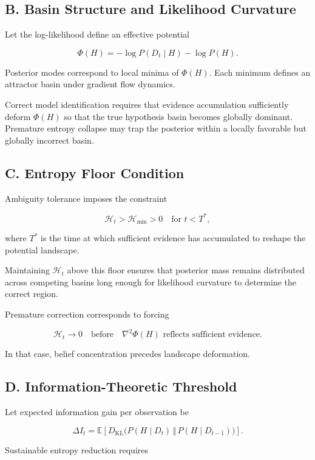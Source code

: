 \documentclass[11pt]{article}
\theoremstyle{remark}
\begin{document}
\subsection*{B. Basin Structure and Likelihood Curvature}

Let the log-likelihood define an effective potential

\[
\Phi(H)
=
- \log P(D_t \mid H) - \log P(H).
\]

Posterior modes correspond to local minima of $\Phi(H)$. Each minimum defines an attractor basin under gradient flow dynamics.

Correct model identification requires that evidence accumulation sufficiently deform $\Phi(H)$ so that the true hypothesis basin becomes globally dominant. Premature entropy collapse may trap the posterior within a locally favorable but globally incorrect basin.

\subsection*{C. Entropy Floor Condition}

Ambiguity tolerance imposes the constraint

\[
\mathcal{H}_t > \mathcal{H}_{\min} > 0
\quad \text{for } t < T^*,
\]

where $T^*$ is the time at which sufficient evidence has accumulated to reshape the potential landscape.

Maintaining $\mathcal{H}_t$ above this floor ensures that posterior mass remains distributed across competing basins long enough for likelihood curvature to determine the correct region.

Premature correction corresponds to forcing

\[
\mathcal{H}_t \to 0
\quad \text{before} \quad
\nabla^2 \Phi(H) \text{ reflects sufficient evidence}.
\]

In that case, belief concentration precedes landscape deformation.

\subsection*{D. Information-Theoretic Threshold}

Let expected information gain per observation be

\[
\Delta I_t
=
\mathbb{E}\!\left[
D_{\mathrm{KL}}
\big(
P(H \mid D_t)
\,\Vert\,
P(H \mid D_{t-1})
\big)
\right].
\]

Sustainable entropy reduction requires
\end{document}
